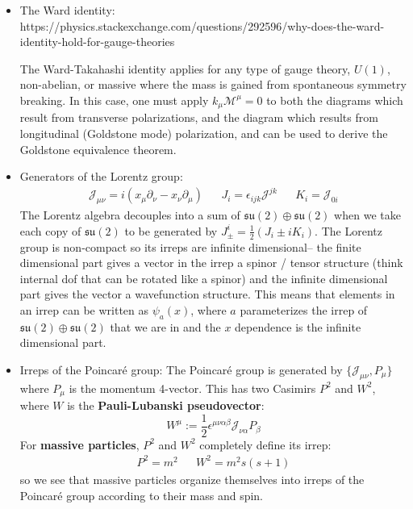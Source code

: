 \documentclass[11pt, oneside]{article}   	%
\theoremstyle{definition}
\numberwithin{equation}{subsection}		%
\begin{document}
\begin{itemize}
	\item The Ward identity: https://physics.stackexchange.com/questions/292596/why-does-the-ward-identity-hold-for-gauge-theories
	
	The Ward-Takahashi identity applies for any type of gauge theory, $U(1)$, non-abelian, or massive where the mass is gained from 
	spontaneous symmetry breaking. In this case, one must apply $k_\mu \mathcal M^\mu = 0$ to both the diagrams which result 
	from transverse polarizations, and the diagram which results from longitudinal (Goldstone mode) polarization, and can be used 
	to derive the Goldstone equivalence theorem. 
	
	\item Generators of the Lorentz group: 
	\begin{align}
		\mathcal J_{\mu\nu} = i(x_\mu\partial_\nu - x_\nu\partial_\mu) && J_i = \epsilon_{ijk} \mathcal J^{jk} && K_i = \mathcal J_{0i}
	\end{align}
	The Lorentz algebra decouples into a sum of $\mathfrak{su}(2)\oplus\mathfrak{su}(2)$ when we take each copy of $\mathfrak{su}(2)$ to 
	be generated by $J_\pm^i = \frac{1}{2}(J_i\pm i K_i)$. The Lorentz group is non-compact so its irreps are infinite dimensional-- the finite 
	dimensional part gives a vector in the irrep a spinor / tensor structure (think internal dof that can be rotated like a spinor) and the infinite 
	dimensional part gives the vector a wavefunction structure. This means that elements in an irrep can be written as 
	$\psi_a(x)$, where $a$ parameterizes the irrep of $\mathfrak{su}(2)\oplus \mathfrak{su}(2)$ that we are in and the $x$ dependence is the 
	infinite dimensional part. 
	
	\item Irreps of the Poincar\'e group: The Poincar\'e group is generated by $\{\mathcal J_{\mu\nu}, P_\mu\}$ where $P_\mu$ is the momentum 
	4-vector. This has two Casimirs $P^2$ and $W^2$, where $W$ is the \textbf{Pauli-Lubanski pseudovector}:
	\begin{equation}
		W^\mu := \frac{1}{2} \epsilon^{\mu\nu\alpha\beta} \mathcal J_{\nu\alpha} P_\beta
	\end{equation}
	For \textbf{massive particles}, $P^2$ and $W^2$ completely define its irrep:
	\begin{align}
		P^2 = m^2 && W^2 = m^2 s (s + 1)
	\end{align}
	so we see that massive particles organize themselves into irreps of the Poincar\'e group according to their mass and spin. 
	

\end{itemize}
\end{document}
